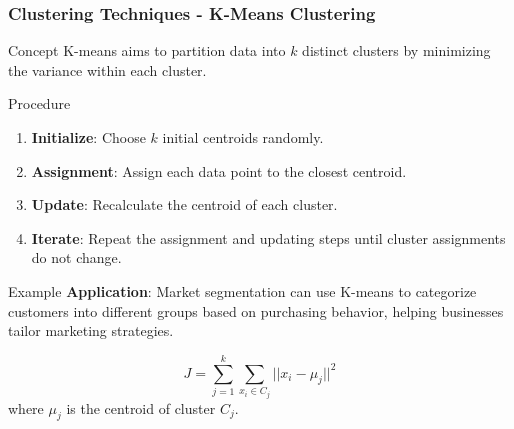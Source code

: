 \documentclass[aspectratio=169]{beamer}
\begin{document}
\begin{frame}[fragile]
    \frametitle{Clustering Techniques - K-Means Clustering}
    \begin{block}{Concept}
        K-means aims to partition data into \( k \) distinct clusters by minimizing the variance within each cluster.
    \end{block}
    
    \begin{block}{Procedure}
        \begin{enumerate}
            \item \textbf{Initialize}: Choose \( k \) initial centroids randomly.
            \item \textbf{Assignment}: Assign each data point to the closest centroid.
            \item \textbf{Update}: Recalculate the centroid of each cluster.
            \item \textbf{Iterate}: Repeat the assignment and updating steps until cluster assignments do not change.
        \end{enumerate}
    \end{block}

    \begin{block}{Example}
        \textbf{Application}: Market segmentation can use K-means to categorize customers into different groups based on purchasing behavior, helping businesses tailor marketing strategies.
    \end{block}

    \begin{equation}
        J = \sum_{j=1}^{k} \sum_{x_i \in C_j} ||x_i - \mu_j||^2
    \end{equation}
    where \( \mu_j \) is the centroid of cluster \( C_j \).
\end{frame}
\end{document}
